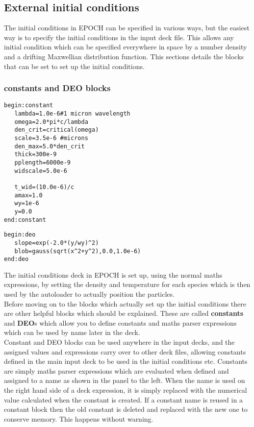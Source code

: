 \documentclass[12pt]{article}
\newcommand{\inlineemph}{\color{warwicklight} \bf}
\newcommand{\boxverbatim}[1]{\begin{Verbatim}[obeytabs=true,frame=single,
  framerule=0.5mm,rulecolor=\color{warwickmid},label=#1]}
\newcommand{\EPOCH}{{\color{warwickdark}\fontfamily{phv}\selectfont EPOCH} }
\begin{document}
\pagebreak

\subsection{External initial conditions}

The initial conditions in \EPOCH can be specified in various ways, but the
easiest way is to specify the initial conditions in the input deck file. This
allows any initial condition which can be specified everywhere in space by a
number density and a drifting Maxwellian distribution function. This sections
details the blocks that can be set to set up the initial conditions.

\subsubsection{{\inlineemph constants} and {\inlineemph DEO} blocks}

\boxverbatim{constant block}
begin:constant
   lambda=1.0e-6#1 micron wavelength
   omega=2.0*pi*c/lambda
   den_crit=critical(omega)
   scale=3.5e-6 #microns
   den_max=5.0*den_crit
   thick=300e-9
   pplength=6000e-9
   widscale=5.0e-6

   t_wid=(10.0e-6)/c
   amax=1.0
   wy=1e-6
   y=0.0
end:constant
\end{Verbatim}

\boxverbatim{deo block}
begin:deo
   slope=exp(-2.0*(y/wy)^2)
   blob=gauss(sqrt(x^2+y^2),0.0,1.0e-6)
end:deo
\end{Verbatim}

The initial conditions deck in \EPOCH is set up, using the normal maths
expressions, by setting the density and temperature for each species which is
then used by the autoloader to actually position the particles.\\

Before moving on to the blocks which actually set up the initial conditions
there are other helpful blocks which should be explained. These are called
{\inlineemph constants} and {\inlineemph DEO}s which allow you to define
constants and maths parser expressions which can be used by name later in the
deck.\\

Constant and DEO blocks can be used anywhere in the input decks, and the
assigned values and expressions carry over to other deck files, allowing
constants defined in the main input deck to be used in the initial conditions
etc. Constants are simply maths parser expressions which are evaluated when
defined and assigned to a name as shown in the panel to the left. When the name
is used on the right hand side of a deck expression, it is simply replaced with
the numerical value calculated when the constant is created.  If a constant
name is reused in a constant block then the old constant is deleted and
replaced with the new one to conserve memory. This happens without warning.\\
\end{document}
